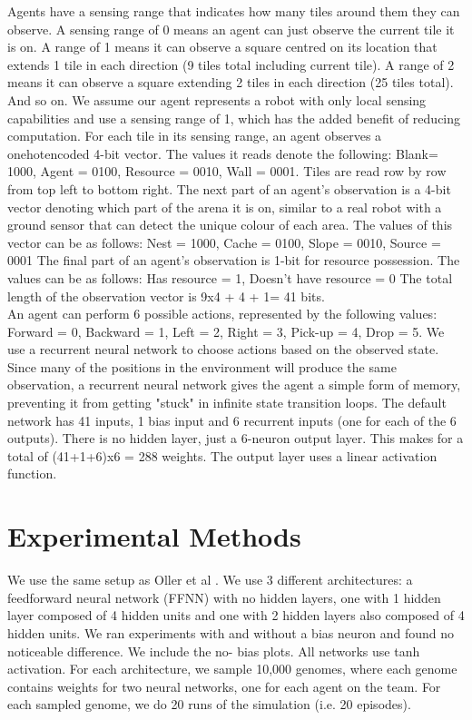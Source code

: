 \documentclass[12pt]{article}
\begin{document}
Agents have a sensing range that indicates how many tiles around them they can observe. 
A sensing range of 0 means an agent can just observe the current tile it is on. 
A range of 1 means it can observe a square centred  on its location that extends 1 tile in each direction (9 tiles total including current tile). 
A range of 2 means it can observe a square extending 2 tiles in each direction (25 tiles total). 
And so on.
We assume our agent represents a robot with only local sensing capabilities and use a sensing range of 1, which has the added benefit of reducing computation.
For each tile in its sensing range, an agent observes a onehotencoded 4-bit vector. 
The values it reads denote the following: Blank= 1000, Agent = 0100, Resource = 0010, Wall = 0001.
Tiles are read row by row from top left to bottom right. 
The next part of an agent's observation is a 4-bit vector denoting which part of the arena it is on, similar to a real robot with a ground sensor that can detect the unique colour of each area.
The values of this vector can be as follows: Nest = 1000, Cache = 0100, Slope = 0010, Source = 0001
The final part of an agent's observation is 1-bit for resource possession. 
The values can be as follows: Has resource = 1, Doesn’t have resource = 0
The total length of the observation vector is 9x4 + 4 + 1= 41 bits.\\

An agent can perform 6 possible actions, represented by the following values: Forward = 0, Backward = 1, Left = 2, Right = 3, Pick-up = 4, Drop = 5.
We use a recurrent neural network to choose actions based on the observed state.
Since many of the positions in the environment will produce the same observation, a recurrent neural network gives the agent a simple form of memory, preventing it from getting "stuck" in infinite state transition loops.
The default network has 41 inputs, 1 bias input and 6 recurrent inputs (one for each of the 6 outputs). 
There is no hidden layer, just a 6-neuron output layer. 
This makes for a total of (41+1+6)x6 = 288 weights. 
The output layer uses a linear activation function.

\section{Experimental Methods}

We use the same setup as Oller et al \cite{oller:AAMAS:2020}.
We use 3 different architectures: a feedforward neural network (FFNN) with no hidden layers, one with 1 hidden layer composed of 4 hidden units and one with 2 hidden layers also composed of 4 hidden units.
We ran experiments with and without a bias neuron and found no noticeable difference. We include the no- bias plots.
All networks use tanh activation.
For each architecture, we sample 10,000 genomes, where each genome contains weights for two neural networks, one for each agent on the team.
For each sampled genome, we do 20 runs of the simulation (i.e. 20 episodes). 
\end{document}
